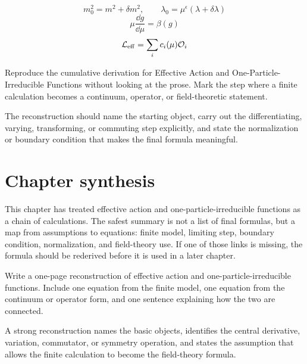 \[
  m_0^2=m^2+\delta m^2,\qquad \lambda_0=\mu^\epsilon(\lambda+\delta\lambda)
\]
\[
  \mu\frac{\dd g}{\dd\mu}=\beta(g)
\]
\[
  \mathcal L_{\mathrm{eff}}=\sum_i c_i(\mu)\mathcal O_i
\]

\begin{exercise}
Reproduce the cumulative derivation for Effective Action and One-Particle-Irreducible Functions without looking at the prose.  Mark the step where a finite calculation becomes a continuum, operator, or field-theoretic statement.
\begin{answer}
The reconstruction should name the starting object, carry out the differentiating, varying, transforming, or commuting step explicitly, and state the normalization or boundary condition that makes the final formula meaningful.
\end{answer}
\end{exercise}



\section{Chapter synthesis}

This chapter has treated effective action and one-particle-irreducible functions as a chain of calculations.  The safest summary is not a list of final formulas, but a map from assumptions to equations: finite model, limiting step, boundary condition, normalization, and field-theory use.  If one of those links is missing, the formula should be rederived before it is used in a later chapter.

\begin{exercise}
Write a one-page reconstruction of effective action and one-particle-irreducible functions.  Include one equation from the finite model, one equation from the continuum or operator form, and one sentence explaining how the two are connected.
\begin{answer}
A strong reconstruction names the basic objects, identifies the central derivative, variation, commutator, or symmetry operation, and states the assumption that allows the finite calculation to become the field-theory formula.
\end{answer}
\end{exercise}
